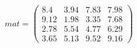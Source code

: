 \[mat = 
\left( \begin{array}{cccc}
8.4 & 3.94 & 7.83 & 7.98 \\ 9.12 & 1.98 & 3.35 & 7.68 \\ 2.78 & 5.54 & 4.77 & 6.29 \\ 3.65 & 5.13 & 9.52 & 9.16 \end{array} \right) \]
